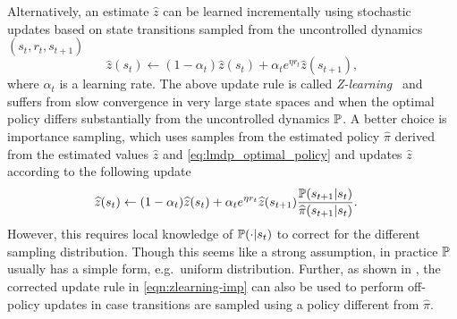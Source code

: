 Alternatively, an estimate $\widehat{z}$ can be learned incrementally using stochastic updates based on state transitions sampled from the uncontrolled dynamics $(s_t,r_t,s_{t+1})$
\[
\widehat{z}(s_t) \leftarrow (1-\alpha_t)\widehat{z}(s_t) + \alpha_t e^{\eta r_t}\widehat{z}(s_{t+1}),
\]
where $\alpha_t$ is a learning rate. 
The above update rule is called \emph{Z-learning}~\citep{Todorov2006} and suffers from slow convergence in very large state spaces and when the optimal policy differs substantially from the uncontrolled dynamics $\mathbb{P}$.
A better choice is importance sampling, which uses samples from the estimated policy $\widehat{\pi}$ derived from the estimated values $\widehat{z}$ and \eqref{eq:lmdp_optimal_policy} and updates $\widehat{z}$ according to the following update
\begin{align}\label{eqn:zlearning-imp}
\widehat{z}(s_t) \leftarrow (1-\alpha_t)& \widehat{z}(s_t) + \alpha_t e^{\eta r_t}\widehat{z}(s_{t+1})\frac {\mathbb{P}(s_{t+1}|s_t)} {\widehat{\pi}(s_{t+1}|s_t)}.
\end{align}
However, this requires local knowledge of $\mathbb{P}(\cdot|s_t)$ to correct for the different sampling distribution.
Though this seems like a strong assumption, in practice $\mathbb{P}$ usually has a simple form, e.g.~uniform distribution.
Further, as shown in \citep{Jonsson2016}, the corrected update rule in \eqref{eqn:zlearning-imp} can also be used to perform off-policy updates in case transitions are sampled using a policy different from $\widehat{\pi}$.

